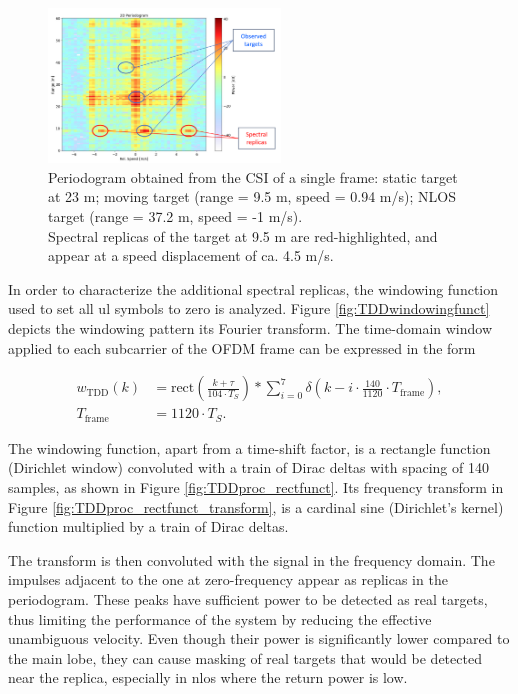     \begin{figure}[H]
        \centering
        \includegraphics[width=0.55\textwidth]{Images/TDDprocessing/SpectralReplicasDLULpattern.png}
        \caption{\small Periodogram obtained from the CSI of a single frame: static target at 23 m; moving target (range = 9.5 m, speed = 0.94 m/s); NLOS target (range = 37.2 m, speed = -1 m/s).\\
        Spectral replicas of the target at 9.5 m are red-highlighted, and appear at a speed displacement of ca. 4.5 m/s.}
        \label{fig:SpectralReplicasDLULpattern}
    \end{figure}
    
    In order to characterize the additional spectral replicas, the windowing function used to set all \gls{ul} symbols to zero is analyzed. Figure \ref{fig:TDDwindowingfunct} depicts the windowing pattern its Fourier transform. The time-domain window applied to each subcarrier of the OFDM frame can be expressed in the form
    
    \begin{align}
        w_{\text{TDD}}(k) &= \text{rect}\left( \frac{k + \tau}{104 \cdot T_S}\right) \ast \sum_{i=0}^7 \delta\left( k - i\cdot \frac{140}{1120}\cdot T_{\text{frame}} \right),  \\
        T_{\text{frame}} &= 1120 \cdot T_S.
    \end{align}

    The windowing function, apart from a time-shift factor, is a rectangle function (Dirichlet window) convoluted with a train of Dirac deltas with spacing of 140 samples, as shown in Figure \ref{fig:TDDproc_rectfunct}. Its frequency transform in Figure \ref{fig:TDDproc_rectfunct_transform}, is a cardinal sine (Dirichlet's kernel) function multiplied by a train of Dirac deltas.

    The transform is then convoluted with the signal in the frequency domain. The impulses adjacent to the one at zero-frequency appear as replicas in the periodogram. These peaks have sufficient power to be detected as real targets, thus limiting the performance of the system by reducing the effective unambiguous velocity. Even though their power is significantly lower compared to the main lobe, they can cause masking of real targets that would be detected near the replica, especially in \gls{nlos} where the return power is low. 

